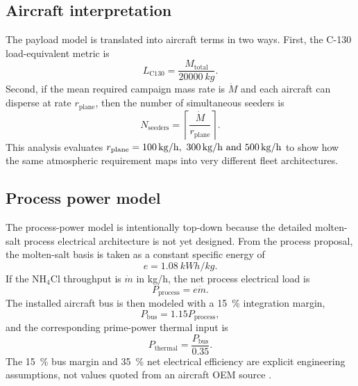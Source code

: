 \documentclass[8pt,twocolumn]{extarticle}
\begin{document}
\subsection*{Aircraft interpretation}

The payload model is translated into aircraft terms in two ways. First, the C-130 load-equivalent metric is
\begin{equation}
L_{\mathrm{C130}} = \frac{M_{\mathrm{total}}}{\SI{20000}{kg}} .
\end{equation}
Second, if the mean required campaign mass rate is $\dot{M}$ and each aircraft can disperse at rate $r_{\mathrm{plane}}$, then the number of simultaneous seeders is
\begin{equation}
N_{\mathrm{seeders}} = \left\lceil \frac{\dot{M}}{r_{\mathrm{plane}}} \right\rceil .
\end{equation}
This analysis evaluates $r_{\mathrm{plane}} = \SIlist{100;300;500}{kg/h}$ to show how the same atmospheric requirement maps into very different fleet architectures.

\subsection*{Process power model}

The process-power model is intentionally top-down because the detailed molten-salt process electrical architecture is not yet designed. From the process proposal, the molten-salt basis is taken as a constant specific energy of
\begin{equation}
e = \SI{1.08}{kWh/kg} .
\end{equation}
If the NH$_4$Cl throughput is $\dot{m}$ in \si{kg/h}, the net process electrical load is
\begin{equation}
P_{\mathrm{process}} = e \dot{m} .
\end{equation}
The installed aircraft bus is then modeled with a \SI{15}{\percent} integration margin,
\begin{equation}
P_{\mathrm{bus}} = 1.15 P_{\mathrm{process}} ,
\end{equation}
and the corresponding prime-power thermal input is
\begin{equation}
P_{\mathrm{thermal}} = \frac{P_{\mathrm{bus}}}{0.35} .
\end{equation}
The \SI{15}{\percent} bus margin and \SI{35}{\percent} net electrical efficiency are explicit engineering assumptions, not values quoted from an aircraft OEM source \citep{AeolusPowerNote}.
\end{document}
